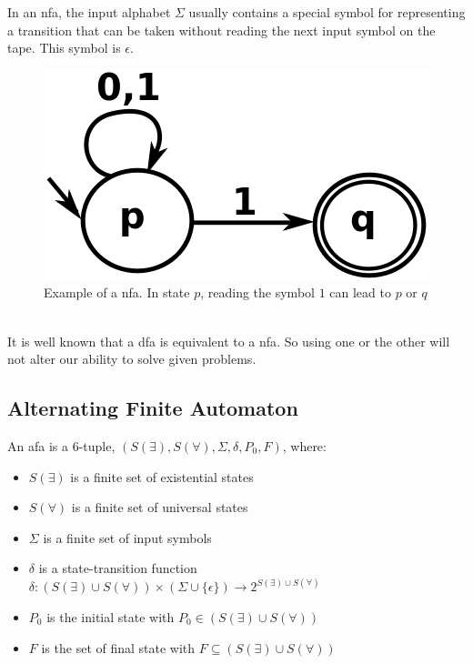 \documentclass[12pt]{article}
\theoremstyle{definition}
\theoremstyle{definition}
\begin{document}
In an \gls{nfa}, the input alphabet $\Sigma$ usually contains a special symbol for representing a transition that can be taken without reading the next input symbol on the tape. This symbol is $\epsilon$.\\

\begin{figure}
    \centering
    \includegraphics[scale=0.4]{graph/nfa.png}
    \caption{Example of a \gls{nfa}. In state $p$, reading the symbol $1$ can lead to $p$ or $q$~\cite{NFA:2017}}
    \label{nfa}
\end{figure}

It is well known that a \gls{dfa} is equivalent to a \gls{nfa}. So using one or the other will not alter our ability to solve given problems.

\subsection{Alternating Finite Automaton}

An \gls{afa} is a 6-tuple, $(S(\exists), S(\forall), \Sigma, \delta, P_0, F)$, where:

\begin{itemize}
\item $S(\exists)$ is a finite set of existential states
\item $S(\forall)$ is a finite set of universal states
\item $\Sigma$ is a finite set of input symbols
\item $\delta$ is a state-transition function $\delta: (S(\exists) \cup S(\forall)) \times (\Sigma \cup \{ \epsilon \}) \rightarrow 2^{S(\exists) \cup S(\forall)}$
\item $P_0$ is the initial state with $P_0 \in (S(\exists) \cup S(\forall))$
\item $F$ is the set of final state with $F \subseteq (S(\exists) \cup S(\forall))$
\end{itemize}
\end{document}
